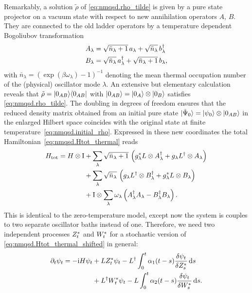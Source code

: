 Remarkably, a solution $\tilde\rho$ of \autoref{eq:nmqsd.rho_tilde} is given by a pure state projector on a vacuum state with respect to new annihilation operators $A$, $B$.
They are connected to the old ladder operators by a temperature dependent Bogoliubov transformation
\begin{align*}
  A_\lambda &= \sqrt{\bar n_\lambda + 1} \, a_\lambda + \sqrt{\bar n_\lambda} \, b^\dagger_\lambda \\
  B_\lambda &= \sqrt{\bar n_\lambda} \, a^\dagger_\lambda + \sqrt{\bar n_\lambda + 1} \, b_\lambda,
\end{align*}
with $\bar n_\lambda = \left( \exp(\beta \omega_\lambda) - 1 \right)^{-1}$ denoting the mean thermal occupation number of the (physical) oscillator mode $\lambda$.
An extensive but elementary calculation \cite{} reveals that $\tilde\rho = | 0_{AB} \rangle\langle 0_{AB} |$ with $| 0_{AB} \rangle = | 0_A \rangle \otimes | 0_B \rangle$ satisfies \autoref{eq:nmqsd.rho_tilde}.
The doubling in degrees of freedom ensures that the reduced density matrix obtained from an initial pure state $| \tilde\Psi_0 \rangle = | \psi_0 \rangle\otimes| 0_{AB} \rangle$ in the enlarged Hilbert space coincides with the original state at finite temperature~\ref{eq:nmqsd.initial_rho}.
Expressed in these new coordinates the total Hamiltonian~\ref{eq:nmqsd.Htot_thermal} reads
\begin{align}
  H_\mathrm{tot} = H\otimes\mathrm{I} &+ \sum_\lambda \sqrt{\bar n_\lambda + 1} \, \left({g}^*_\lambda L\otimes A^\dagger_\lambda + g_\lambda L^\dagger\otimes A_\lambda \right) \nonumber \\
        \label{eq:nmqsd.Htot_thermal_shifted}
        &+ \sum_\lambda \sqrt{\bar n_\lambda} \, \left( g_\lambda L^\dagger\otimes B^\dagger_\lambda  + {g}^*_\lambda L \otimes B_\lambda \right) \\
        &+ \mathrm{I} \otimes \sum_\lambda \omega_\lambda \left( A^\dagger_\lambda A_\lambda - B^\dagger_\lambda B_\lambda \right). \nonumber
\end{align}
This is identical to the zero-temperature model, except now the system is couples to two separate oscillator baths instead of one.
Therefore, we need two independent processes ${Z}^*_t$ and ${W}^*_t$ for a stochastic version of \autoref{eq:nmqsd.Htot_thermal_shifted} in general:
\begin{align}
  \partial_t \psi_t = -\mathrm{i}H\psi_t &+ L{Z}^*_t\psi_t - L^\dagger\int_0^t \alpha_1(t-s) \frac{\delta \psi_t}{\delta {Z}^*_s} \, \mathrm{d} s \nonumber \\
  &+ L^\dagger {W}^*_t \psi_t - L\int_0^t \alpha_2(t-s) \frac{\delta\psi_t}{\delta {W}^*_s} \, \mathrm{d} s.
  \label{eq:nmqsd.nmsse_thermal_2processes}
\end{align}
